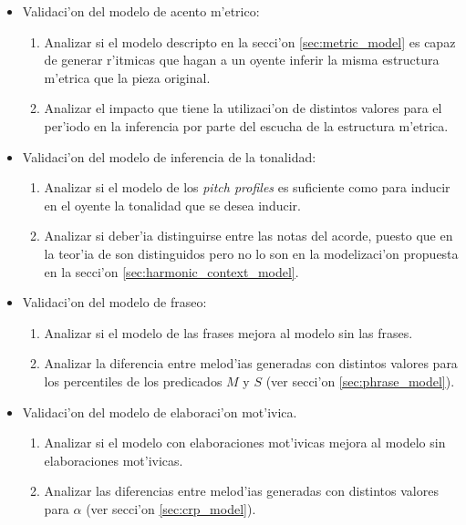 \begin{itemize}
  \item Validaci'on del modelo de acento m'etrico:
    \begin{enumerate}
      \item Analizar si el modelo descripto en la secci'on \ref{sec:metric_model} es capaz de generar r'itmicas que hagan a un oyente inferir la misma 
            estructura m'etrica que la pieza original. 
      \item Analizar el impacto que tiene la utilizaci'on de distintos valores para el per'iodo en la inferencia por parte del escucha de la estructura m'etrica.

    \end{enumerate}

  \item Validaci'on del modelo de inferencia de la tonalidad: 
    \begin{enumerate}
      \item Analizar si el modelo de los \emph{pitch profiles} es suficiente como para inducir en el oyente la tonalidad que se desea inducir. 
      \item Analizar si deber'ia distinguirse entre las notas del acorde, puesto que en la teor'ia de \cite{Lerdahl2001} son distinguidos pero no lo son en 
      la modelizaci'on propuesta en la secci'on \ref{sec:harmonic_context_model}.
    \end{enumerate}

  \item Validaci'on del modelo de fraseo:
    \begin{enumerate}
      \item Analizar si el modelo de las frases mejora al modelo sin las frases.
      \item Analizar la diferencia entre melod'ias generadas con distintos valores para los percentiles de los predicados $M$ y $S$ (ver secci'on \ref{sec:phrase_model}).
    \end{enumerate}


  \item Validaci'on del modelo de elaboraci'on mot'ivica.
    \begin{enumerate}
      \item Analizar si el modelo con elaboraciones mot'ivicas mejora al modelo sin elaboraciones mot'ivicas.
      \item Analizar las diferencias entre melod'ias generadas con distintos valores para $\alpha$ (ver secci'on \ref{sec:crp_model}).

    \end{enumerate}



\end{itemize}

